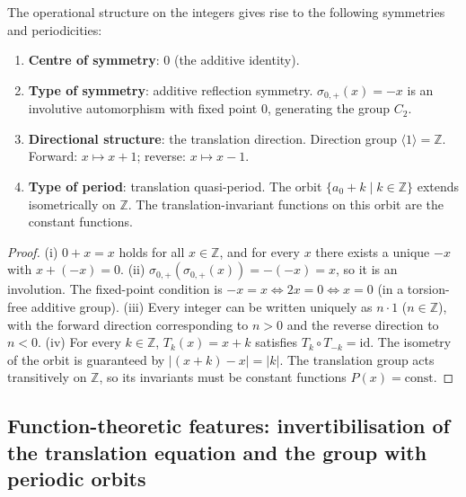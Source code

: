 \begin{proposition}\label{prop:integer_symmetry_direction_period}
The operational structure on the integers gives rise to the following symmetries and periodicities:
\begin{enumerate}[label=(\roman*)]
    \item \textbf{Centre of symmetry}: $0$ (the additive identity).
    \item \textbf{Type of symmetry}: additive reflection symmetry. $\sigma_{0,+}(x) = -x$ is an involutive automorphism with fixed point $0$, generating the group $C_2$.
    \item \textbf{Directional structure}: the translation direction. Direction group $\langle 1 \rangle = \mathbb{Z}$. Forward: $x \mapsto x + 1$; reverse: $x \mapsto x - 1$.
    \item \textbf{Type of period}: translation quasi-period. The orbit $\{a_0 + k \mid k \in \mathbb{Z}\}$ extends isometrically on $\mathbb{Z}$. The translation-invariant functions on this orbit are the constant functions.
\end{enumerate}
\end{proposition}

\begin{proof}
(i) $0 + x = x$ holds for all $x \in \mathbb{Z}$, and for every $x$ there exists a unique $-x$ with $x + (-x) = 0$.
(ii) $\sigma_{0,+}(\sigma_{0,+}(x)) = -(-x) = x$, so it is an involution. The fixed-point condition is $-x = x \iff 2x = 0 \iff x = 0$ (in a torsion-free additive group).
(iii) Every integer can be written uniquely as $n \cdot 1$ ($n \in \mathbb{Z}$), with the forward direction corresponding to $n>0$ and the reverse direction to $n<0$.
(iv) For every $k \in \mathbb{Z}$, $T_k(x) = x + k$ satisfies $T_k \circ T_{-k} = \text{id}$. The isometry of the orbit is guaranteed by $|(x+k) - x| = |k|$. The translation group acts transitively on $\mathbb{Z}$, so its invariants must be constant functions $P(x) = \text{const}$.
\end{proof}

\subsection{\texorpdfstring{Function-theoretic features: invertibilisation of the translation equation and the group with periodic orbits}{Function-theoretic features: invertibilisation of the translation equation and the group with periodic orbits}}

